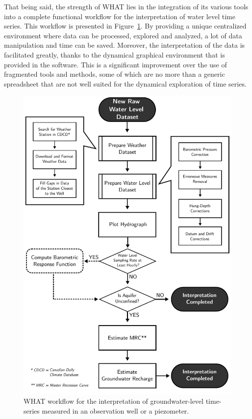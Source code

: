 \documentclass[WHATMANUAL.tex]{subfiles}
\begin{document}
That being said, the strength of WHAT lies in the integration of its various tools into a complete functional workflow for the interpretation of water level time series. This workflow is presented in Figure~\ref{fig:WHAT_workflow}. By providing a unique centralized environment where data can be processed, explored and analyzed, a lot of data manipulation and time can be saved. Moreover, the interpretation of the data is facilitated greatly, thanks to the dynamical graphical environment that is provided in the software. This is a significant improvement over the use of fragmented tools and methods, some of which are no more than a generic spreadsheet that are not well suited for the dynamical exploration of time series.

\begin{figure}
\centering
\includegraphics[height=0.95\textheight]{img/WHAT_Workflow}
\caption[WHAT workflow.]{WHAT workflow for the interpretation of groundwater-level time-series measured in an observation well or a piezometer.}
\label{fig:WHAT_workflow}
\end{figure}
\end{document}
